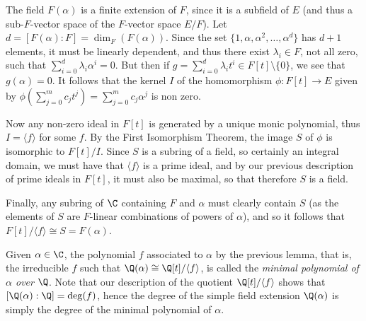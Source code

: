 \documentclass{maths}
\begin{document}
\begin{prf}
    The field $F(\alpha)$ is a finite extension of $F$, since it is a subfield of $E$ (and thus a sub-$F$-vector space of the $F$-vector space $E/F$).
    Let $d=[F(\alpha):F]=\dim_F(F(\alpha))$.
    Since the set $\{1,\alpha,\alpha^2,\ldots,\alpha^d\}$ has $d+1$ elements, it must be linearly dependent, and thus there exist $\lambda_i\in F$, not all zero, such that $\sum_{i=0}^d \lambda_i\alpha^i=0$.
    But then if $g=\sum_{i=0}^d \lambda_i t^i\in F[t]\setminus\{0\}$, we see that $g(\alpha)=0$.
    It follows that the kernel $I$ of the homomorphism $\phi\colon F[t]\to E$ given by $\phi(\sum_{j=0}^m c_j t^j)=\sum_{j=0}^m c_j \alpha^j$ is non zero.

    Now any non-zero ideal in $F[t]$ is generated by a unique monic polynomial, thus $I=\langle f\rangle$ for some $f$.
    By the First Isomorphism Theorem, the image $S$ of $\phi$ is isomorphic to $F[t]/I$.
    Since $S$ is a subring of a field, so certainly an integral domain, we must have that $\langle f\rangle$ is a prime ideal, and by our previous description of prime ideals in $F[t]$, it must also be maximal, so that therefore $S$ is a field.

    Finally, any subring of $\C$ containing $F$ and $\alpha$ must clearly contain $S$ (as the elements of $S$ are $F$-linear combinations of powers of $\alpha$), and so it follows that $F[t]/\langle f\rangle\cong S=F(\alpha)$.
\end{prf}

\begin{defn}
    Given $\alpha\in\C$, the polynomial $f$ associated to $\alpha$ by the previous lemma, that is, the irreducible $f$ such that $\Q(\alpha)\cong\Q[t]/\langle f\rangle$, is called the \emph{minimal polynomial of $\alpha$ over $\Q$}.
    Note that our description of the quotient $\Q[t]/\langle f\rangle$ shows that $[\Q(\alpha):\Q]=\deg(f)$, hence the degree of the simple field extension $\Q(\alpha)$ is simply the degree of the minimal polynomial of $\alpha$.
\end{defn}
\end{document}
